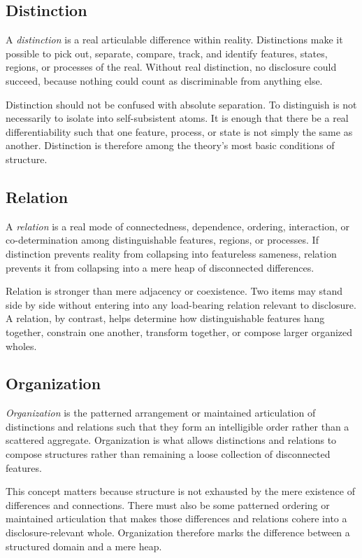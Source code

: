 \documentclass[11pt]{article}
\renewcommand{\emph}[1]{\textit{#1}}
\begin{document}
\subsection{Distinction}

A \emph{distinction} is a real articulable difference within reality. Distinctions make it possible to pick out, separate, compare, track, and identify features, states, regions, or processes of the real. Without real distinction, no disclosure could succeed, because nothing could count as discriminable from anything else.

Distinction should not be confused with absolute separation. To distinguish is not necessarily to isolate into self-subsistent atoms. It is enough that there be a real differentiability such that one feature, process, or state is not simply the same as another. Distinction is therefore among the theory's most basic conditions of structure.

\subsection{Relation}

A \emph{relation} is a real mode of connectedness, dependence, ordering, interaction, or co-determination among distinguishable features, regions, or processes. If distinction prevents reality from collapsing into featureless sameness, relation prevents it from collapsing into a mere heap of disconnected differences.

Relation is stronger than mere adjacency or coexistence. Two items may stand side by side without entering into any load-bearing relation relevant to disclosure. A relation, by contrast, helps determine how distinguishable features hang together, constrain one another, transform together, or compose larger organized wholes. \cite{LadymanRoss2007EveryThingMustGo}

\subsection{Organization}

\emph{Organization} is the patterned arrangement or maintained articulation of distinctions and relations such that they form an intelligible order rather than a scattered aggregate. Organization is what allows distinctions and relations to compose structures rather than remaining a loose collection of disconnected features.

This concept matters because structure is not exhausted by the mere existence of differences and connections. There must also be some patterned ordering or maintained articulation that makes those differences and relations cohere into a disclosure-relevant whole. Organization therefore marks the difference between a structured domain and a mere heap.
\end{document}
